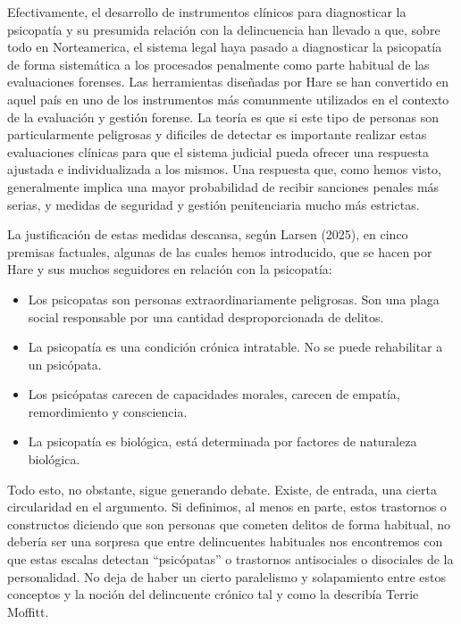 \documentclass[
  spanish,
  letterpaper,
  DIV=11,
  numbers=noendperiod]{scrreprt}
\begin{document}
Efectivamente, el desarrollo de instrumentos clínicos para diagnosticar
la psicopatía y su presumida relación con la delincuencia han llevado a
que, sobre todo en Norteamerica, el sistema legal haya pasado a
diagnosticar la psicopatía de forma sistemática a los procesados
penalmente como parte habitual de las evaluaciones forenses. Las
herramientas diseñadas por Hare se han convertido en aquel país en uno
de los instrumentos más comunmente utilizados en el contexto de la
evaluación y gestión forense. La teoría es que si este tipo de personas
son particularmente peligrosas y dificiles de detectar es importante
realizar estas evaluaciones clínicas para que el sistema judicial pueda
ofrecer una respuesta ajustada e individualizada a los mismos. Una
respuesta que, como hemos visto, generalmente implica una mayor
probabilidad de recibir sanciones penales más serias, y medidas de
seguridad y gestión penitenciaria mucho más estrictas.

La justificación de estas medidas descansa, según Larsen (2025), en
cinco premisas factuales, algunas de las cuales hemos introducido, que
se hacen por Hare y sus muchos seguidores en relación con la psicopatía:

\begin{itemize}
\item
  Los psicopatas son personas extraordinariamente peligrosas. Son una
  plaga social responsable por una cantidad desproporcionada de delitos.
\item
  La psicopatía es una condición crónica intratable. No se puede
  rehabilitar a un psicópata.
\item
  Los psicópatas carecen de capacidades morales, carecen de empatía,
  remordimiento y consciencia.
\item
  La psicopatía es biológica, está determinada por factores de
  naturaleza biológica.
\end{itemize}

Todo esto, no obstante, sigue generando debate. Existe, de entrada, una
cierta circularidad en el argumento. Si definimos, al menos en parte,
estos trastornos o constructos diciendo que son personas que cometen
delitos de forma habitual, no debería ser una sorpresa que entre
delincuentes habituales nos encontremos con que estas escalas detectan
``psicópatas'' o trastornos antisociales o disociales de la
personalidad. No deja de haber un cierto paralelismo y solapamiento
entre estos conceptos y la noción del delincuente crónico tal y como la
describía Terrie Moffitt.
\end{document}
